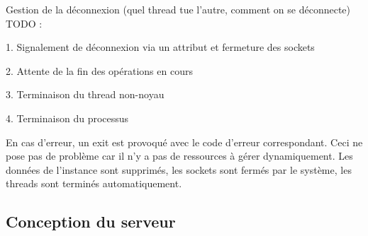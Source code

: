 \documentclass{article}
\begin{document}
 Gestion de la déconnexion (quel thread tue l'autre, comment on se déconnecte) TODO :

1. Signalement de déconnexion via un attribut et fermeture des sockets

2. Attente de la fin des opérations en cours

3. Terminaison du thread non-noyau

4. Terminaison du processus

En cas d'erreur, un exit est provoqué avec le code d'erreur correspondant. Ceci ne pose pas de problème car il n'y a pas de ressources à gérer dynamiquement. Les données de l'instance sont supprimés, les sockets sont fermés par le système, les threads sont terminés automatiquement.

\subsection{Conception du serveur}
\end{document}
